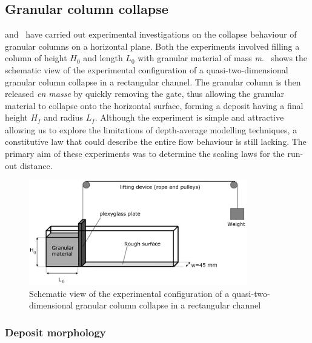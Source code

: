 \subsection{Granular column collapse}
\citet{Lube2005} and~\citet{Lajeunesse2004} have carried out experimental 
investigations on the collapse behaviour of granular columns on a horizontal 
plane. Both the experiments involved filling a column of height 
$\textit{H}_{\textit{0}}$ and length $\textit{L}_{\textit{0}}$ with granular 
material of mass \textit{m}.~ shows the schematic view of the 
experimental configuration of a quasi-two-dimensional granular column collapse 
in a rectangular channel. The granular column is then released \textit{en 
masse} by quickly removing the gate, thus allowing the granular material to 
collapse onto the horizontal surface, forming a deposit having a final height 
$\textit{H}_{\textit{f}}$ and radius $\textit{L}_{\textit{f}}$. Although the 
experiment is simple and attractive allowing us to explore the limitations of 
depth-average modelling techniques, a constitutive law that could describe the 
entire flow behaviour is still lacking. The primary aim of these experiments 
was to determine the scaling laws for the run-out distance.


\begin{figure}[tbhp]
\centering
\includegraphics[width=0.85\textwidth]{experiment_setup}
\caption{Schematic view of the experimental configuration of a 
quasi-two-dimensional granular column 
collapse in a rectangular channel~\citep{Lajeunesse2004}}
\label{fig:exp}
\end{figure}

\subsubsection{Deposit morphology}


